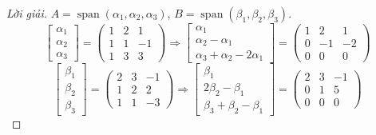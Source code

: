 \begin{proof}[Lời giải]$A = \operatorname{span}(\alpha_{1},\alpha_{2},\alpha_{3})$, $B = \operatorname{span}(\beta_{1},\beta_{2},\beta_{3})$.
    \[
        \begin{bmatrix}
            \alpha_{1} \\
            \alpha_{2} \\
            \alpha_{3}
        \end{bmatrix}=
        \begin{pmatrix}
            1 & 2 & 1  \\
            1 & 1 & -1 \\
            1 & 3 & 3
        \end{pmatrix}
        \Longrightarrow
        \begin{bmatrix}
            \alpha_{1}            \\
            \alpha_{2}-\alpha_{1} \\
            \alpha_{3}+\alpha_{2}-2\alpha_{1}
        \end{bmatrix}=
        \begin{pmatrix}
            1 & 2  & 1  \\
            0 & -1 & -2 \\
            0 & 0  & 0
        \end{pmatrix}
    \]
    \[
        \begin{bmatrix}
            \beta_{1} \\
            \beta_{2} \\
            \beta_{3}
        \end{bmatrix}=
        \begin{pmatrix}
            2 & 3 & -1 \\
            1 & 2 & 2  \\
            1 & 1 & -3
        \end{pmatrix}
        \Longrightarrow
        \begin{bmatrix}
            \beta_{1}            \\
            2\beta_{2}-\beta_{1} \\
            \beta_{3}+\beta_{2}-\beta_{1}
        \end{bmatrix}=
        \begin{pmatrix}
            2 & 3 & -1 \\
            0 & 1 & 5  \\
            0 & 0 & 0
        \end{pmatrix}
    \]
    

\end{proof}
